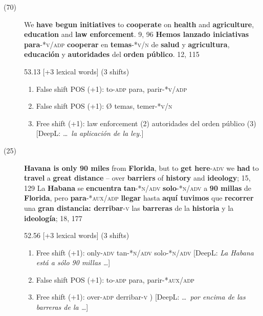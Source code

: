 \documentclass[output=paper]{langsci/langscibook}
\begin{document}
\begin{description}
  \item[(70)] We \textbf{have begun initiatives} to \textbf{cooperate} on \textbf{health} and \textbf{agriculture}, \textbf{education} and \textbf{law enforcement}. 9, 96 \rightarrow \textbf{Hemos lanzado iniciativas para}\textsc{-*v/adp} \textbf{cooperar} en \textbf{temas}\textsc{-*v/n} de \textbf{salud} y \textbf{agricultura}, \textbf{educación} y \textbf{autoridades} del \textbf{orden público}. 12, 115

    53.13 [+3 lexical words] (3 shifts)

    \begin{enumerate}
      \item False shift POS (+1): to\textsc{-adp} \rightarrow para, parir\textsc{-*v/adp}
      \item False shift POS (+1): Ø \rightarrow temas, temer\textsc{-*v/n}
      \item Free shift (+1): law enforcement (2) \rightarrow autoridades del orden público (3) [DeepL: \dots\ \textit{la aplicación de la ley.}]
    \end{enumerate}

  \item[(25)] \textbf{Havana is only 90 miles} from \textbf{Florida}, but to \textbf{get here}\textsc{-adv} we \textbf{had} to \textbf{travel} a \textbf{great distance} -- over \textbf{barriers} of \textbf{history} and \textbf{ideology}; 15, 129 \rightarrow La \textbf{Habana} se \textbf{encuentra} \textbf{tan}\textsc{-*n/adv} \textbf{solo}\textsc{-*n/adv} a \textbf{90 millas} de \textbf{Florida}, pero \textbf{para}\textsc{-*aux/adp} \textbf{llegar} hasta \textbf{aquí tuvimos} que \textbf{recorrer} una \textbf{gran distancia: derribar}\textsc{-v} las \textbf{barreras} de la \textbf{historia} y la \textbf{ideología}; 18, 177

    52.56 [+3 lexical words] (3 shifts)

    \begin{enumerate}
      \item Free shift (+1): only-\textsc{adv} \rightarrow tan\textsc{-*n/adv} solo\textsc{-*n/adv} [DeepL: \textit{La Habana está a sólo 90 millas \dots}]
      \item False shift POS (+1): to-\textsc{adp} \rightarrow para, parir\textsc{-*aux/adp}
      \item Free shift (+1): over-\textsc{adp} \rightarrow derribar-\textsc{v} ) [DeepL: \dots\ \textit{por encima de las barreras de la \dots}]
    \end{enumerate}


\end{description}
\end{document}
